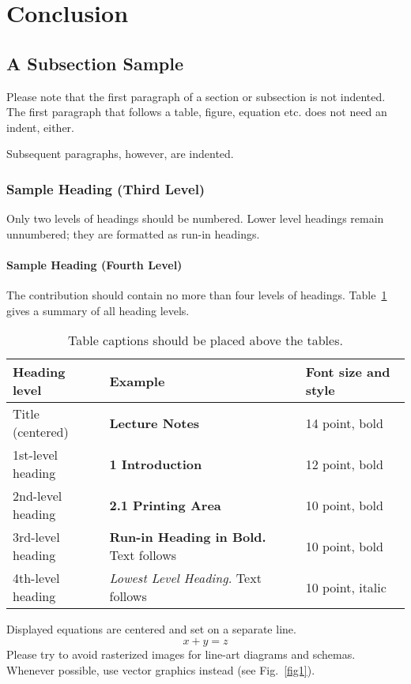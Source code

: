 \documentclass[runningheads]{llncs}
\begin{document}
\section{Conclusion} \label{chap:6} %

\subsection{A Subsection Sample}
Please note that the first paragraph of a section or subsection is
not indented. The first paragraph that follows a table, figure,
equation etc. does not need an indent, either.

Subsequent paragraphs, however, are indented.

\subsubsection{Sample Heading (Third Level)} Only two levels of
headings should be numbered. Lower level headings remain unnumbered;
they are formatted as run-in headings.

\paragraph{Sample Heading (Fourth Level)}
The contribution should contain no more than four levels of
headings. Table~\ref{tab1} gives a summary of all heading levels.

\begin{table}
\caption{Table captions should be placed above the
tables.}\label{tab1}
\begin{tabular}{|l|l|l|}
\hline
Heading level &  Example & Font size and style\\
\hline
Title (centered) &  {\Large\bfseries Lecture Notes} & 14 point, bold\\
1st-level heading &  {\large\bfseries 1 Introduction} & 12 point, bold\\
2nd-level heading & {\bfseries 2.1 Printing Area} & 10 point, bold\\
3rd-level heading & {\bfseries Run-in Heading in Bold.} Text follows & 10 point, bold\\
4th-level heading & {\itshape Lowest Level Heading.} Text follows & 10 point, italic\\
\hline
\end{tabular}
\end{table}


\noindent Displayed equations are centered and set on a separate
line.
\begin{equation}
x + y = z
\end{equation}
Please try to avoid rasterized images for line-art diagrams and
schemas. Whenever possible, use vector graphics instead (see
Fig.~\ref{fig1}).
\end{document}

